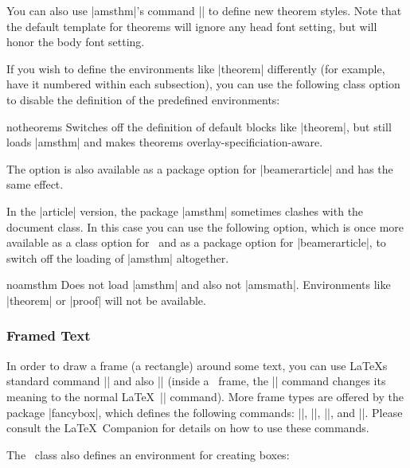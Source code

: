 You can also use |amsthm|'s command |\newtheoremstyle| to define new
theorem styles. Note that the default template for theorems will
ignore any head font setting, but will honor the body font setting.

If you wish to define the environments like |theorem| differently (for
example, have it numbered within each subsection), you can use the
following class option to disable the definition of the predefined
environments: 

\begin{classoption}{{notheorems}}
  Switches off the definition of default blocks like |theorem|, but
  still loads |amsthm| and makes theorems  
  overlay-specificiation-aware.
\end{classoption}

The option is also available as a package option for
|beamerarticle| and has the same effect.

\articlenote
In the |article| version, the package |amsthm| sometimes clashes with
the document class. In this case you can use the following option,
which is once more available as a class option for \beamer\ and as a
package option for |beamerarticle|, to switch off the loading of
|amsthm| altogether. 

\begin{classoption}{{noamsthm}}
  Does not load |amsthm| and also not |amsmath|. Environments like
  |theorem| or |proof| will not be available.
\end{classoption}




\subsubsection{Framed Text}

In order to draw a frame (a rectangle) around some text, you can use
\LaTeX s standard command |\fbox| and also |\frame| (inside a \beamer{}, the |\frame| command changes its meaning to the normal \LaTeX\
|\frame| command). More frame types are offered by the
package |fancybox|, which defines the following commands:
|\shadowbox|, |\doublebox|, |\ovalbox|, and |\Ovalbox|. Please consult
the \LaTeX\ Companion for details on how to use these commands.

The \beamer\ class also defines an environment for creating boxes:

